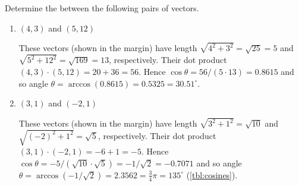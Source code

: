 \begin{example} \label{eg:}
Determine the  between the following pairs of vectors.
\begin{enumerate}
\item \((4,3)\) and \((5,12)\)
\begin{solution} 
These vectors (shown in the margin) 
%
have length \(\sqrt{4^2+3^2}=\sqrt{25}=5\) and \(\sqrt{5^2+12^2}=\sqrt{169}=13\), respectively.
Their dot product  \((4,3)\cdot(5,12)=20+36=56\).
Hence \(\cos\theta =56/(5\cdot13) =0.8615\) and so angle \(\theta =\arccos(0.8615) =0.5325 =30.51^\circ\).
\end{solution}


\item \((3,1)\) and \((-2,1)\)
\begin{solution} 
These vectors (shown in the margin) 
%
have length \(\sqrt{3^2+1^2}=\sqrt{10}\) and \(\sqrt{(-2)^2+1^2}=\sqrt{5}\), respectively.
Their dot product  \((3,1)\cdot(-2,1)=-6+1=-5\).
Hence \(\cos\theta =-5/(\sqrt{10}\cdot\sqrt5) =-1/\sqrt2 =-0.7071\) and so angle \(\theta =\arccos(-1/\sqrt2) =2.3562 =\frac34\pi =135^\circ\) (\autoref{tbl:cosines}).
\end{solution}




\end{enumerate}
\end{example}
